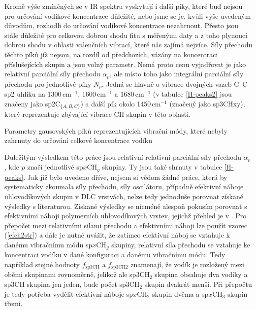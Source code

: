 Kromě výše zmíněných se v IR spektru vyskytují i další píky, které buď nejsou pro určování vodíkové koncentrace důležité, nebo jsme se je, kvůli výše uvedeným důvodům, rozhodli do určování vodíkové koncentrace nezahrnout. Přesto jsou stále důležité pro celkovou dobrou shodu fitu s měřenými daty a z toho plynoucí dobrou shodu v oblasti valenčních vibrací, které nás zajímá nejvíce. Síly přechodu těchto píků jíž nejsou, na rozdíl od předchozích, vázány na koncentraci příslušejících skupin a jsou volný parametr. 
Nemá proto cenu vyjadřovat je jako relativní parciální síly přechodu $\alpha_p$, ale místo toho jako integrální parciální síly přechodu pro jednotlivé píky $N_p$. Jedná se hlavně o vibrace dvojných vazeb C--C sp2 uhlíku na 1300\,cm$^{-1}$, 1600\,cm$^{-1}$ a 1680\,cm$^{-1}$ \cite{Robertson2002, Theye2001, Zajickova2011} (v tabulce \ref{H-peaks2} jsou značeny jako sp2C$_{\{A,B,C\}}$) a další pík okolo 1450\,cm$^{-1}$ (značený jako sp3CHxy), který reprezentuje zbývající vibrace CH skupin v této oblasti.

\begin{table}[tbp]
 \centering
	\renewcommand{\tabcolsep}{1pt}
 
 \caption{Parametry gausovských píků reprezentujících vibrační módy, které nebyly zahrnuty do určování celkové koncentrace vodíku}
\label{H-peaks2}
\end{table}

Důležitým výsledkem této práce jsou relativní relativní parciální síly přechodu $\alpha_p$, kde $p$ značí jednotlivé sp$x$CH$_y$ skupiny. Ty jsou také shrnuty v tabulce \ref{H-peaks}. Jak již bylo uvedeno dříve, nejsem si vědom žádné práce, která by systematicky zkoumala síly přechodu, síly oscilátoru, případně efektivní náboje uhlovodíkových skupin v DLC vrstvách, nelze tedy jednoduše porovnat získané výsledky s literaturou. 
Získané výsledky se nicméně alespoň pokusím porovnat s efektivními náboji polymerních uhlovodíkových vrstev, jejichž přehled je v \cite{Heitz1998}. Pro přepočet mezi relativními silami přechodu a efektivními náboji lze použít vzorec (\ref{efch2str}) a dále je nutné uvážit, že zatímco efektivní náboj se vztahuje k danému vibračnímu módu sp$x$CH$_y$ skupiny, relativní síla přechodu se vztahuje ke koncentraci vodíku v dané konfiguraci a danému vibračnímu módu. 
Tedy například stejné hodnoty $f_\mathrm{sp3CH}$ a $f_\mathrm{sp3CH2}$ znamenají, že vodík je rozložený mezi oběmi skupinami rovnoměrně, jelikož ale sp3CH$_2$ skupina obsahuje dva vodíky a sp3CH skupina jen jeden, bude počet sp3CH$_2$ skupin dvakrát menší. Při přepočtu je tedy potřeba vydělit efektivní náboje sp$x$CH$_2$ skupin dvěma a sp$x$CH$_3$ skupin třemi. 

